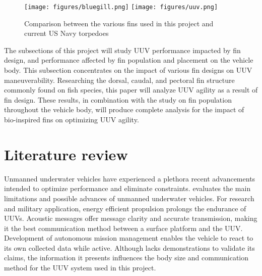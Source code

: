 \documentclass{IEEEtran}
\begin{document}
\begin{figure*}
\begin{center}
\texttt{[image: figures/bluegill.png]}
\texttt{[image: figures/uuv.png]}
\end{center}
\caption{Comparison between the various fins used in this project and current US Navy torpedoes \cite{lauder2004morphology}}
\label{fig:2}
\end{figure*}

The subsections of this project will study UUV performance impacted by fin design, and performance affected by fin population and placement on the vehicle body. This subsection concentrates on the impact of various fin designs on UUV maneuverability. Researching the dorsal, caudal, and pectoral fin structure commonly found on fish species, this paper will analyze UUV agility as a result of fin design.  These results, in combination with the study on fin population throughout the vehicle body, will produce complete analysis for the impact of bio-inspired fins on optimizing UUV agility.  

\section{Literature review}
Unmanned underwater vehicles have experienced a plethora recent advancements intended to optimize performance and eliminate constraints.  \cite{hiller2012expanding} evaluates the main limitations and possible advances of unmanned underwater vehicles.  For research and military application, energy efficient propulsion prolongs the endurance of UUVs.  Acoustic messages offer message clarity and accurate transmission, making it the best communication method between a surface platform and the UUV.  Development of autonomous mission management enables the vehicle to react to its own collected data while active.  Although \cite{hiller2012expanding} lacks demonstrations to validate its claims, the information it presents influences the body size and communication method for the UUV system used in this project.  
\end{document}
